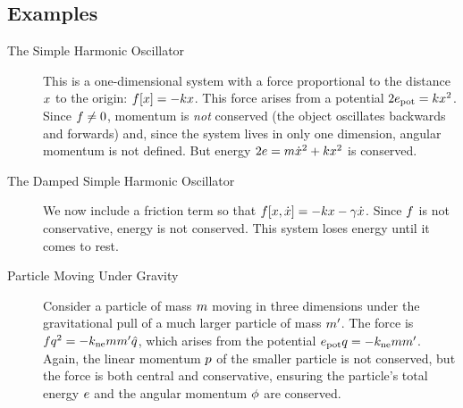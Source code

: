 \subsection{Examples}
%
\begin{description}
%
\item[The Simple Harmonic Oscillator] This is a one-dimensional system with a force proportional to the distance $x$ to the
origin: $f\!\left[{x}\right] = -kx$. This force arises from a potential $2e_\text{pot} = kx^2$. Since $f \not= 0$, momentum is \emph{not} conserved (the object oscillates backwards and forwards) and, since the system lives in only one dimension, angular momentum is not defined. But energy $2e = m\dot{x}^2 + kx^2$ is conserved.
%
\item[The Damped Simple Harmonic Oscillator] We now include a friction term so that $f\!\left[{x, \dot{x}}\right] = -kx - \gamma\dot{x}$. Since $f$ is not conservative,
%
%
energy is not conserved. This system loses energy until it comes to rest.
%
\item[Particle Moving Under Gravity] Consider a particle of mass $m$ moving in three dimensions under the gravitational pull of a much larger particle of mass $m'$. The force is $fq^2 = -k_\text{ne}mm'\hat{q}$, which arises from the potential $e_\text{pot}q = -k_\text{ne}mm'$. Again, the linear momentum $p$ of the smaller particle is not conserved, but the force is both central and conservative, ensuring the particle's total energy $e$ and the angular momentum $\phi$ are conserved.
%
\end{description}
